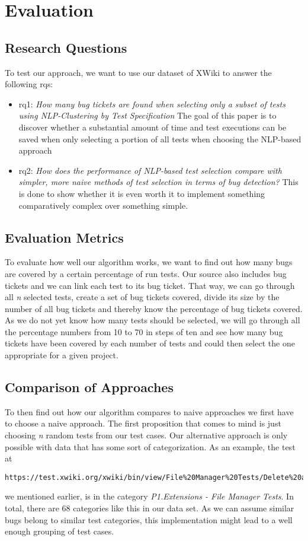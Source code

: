 \section{Evaluation}
\subsection{Research Questions}
To test our approach, we want to use our dataset of XWiki to answer the following \acp{rq}:
\begin{itemize}
    \item \ac{rq}1: \emph{How many bug tickets are found when selecting only a subset of tests using NLP-Clustering by Test Specification}
    The goal of this paper is to discover whether a substantial amount of time and test executions can be saved when only selecting a portion of all tests when choosing the \ac{NLP}-based approach
    \item \ac{rq}2: \emph{How does the performance of NLP-based test selection compare with simpler, more naive methods of test selection in terms of bug detection?} This is done to show whether it is even worth it to implement something comparatively complex over something simple.
\end{itemize}

\subsection{Evaluation Metrics}
To evaluate how well our algorithm works, we want to find out how many bugs are
covered by a certain percentage of run tests. Our source also includes bug
tickets and we can link each test to its bug ticket. That way, we can go
through all \emph{n} selected tests, create a set of bug tickets covered, divide
its size by the number of all bug tickets and thereby know the percentage of bug
tickets covered. As we do not yet know how many tests should be selected, we
will go through all the percentage numbers from 10 to 70 in steps of ten and
see how many bug tickets have been covered by each number of tests and could then select the one appropriate for a given project.

\subsection{Comparison of Approaches}
To then find out how our algorithm compares to naive approaches we first have
to choose a naive approach. The first proposition that comes to mind is just
choosing \emph{n} random tests from our test cases. Our alternative approach is only
possible with data that has some sort of categorization. As an example, the
test at
\begin{verbatim}
https://test.xwiki.org/xwiki/bin/view/File%20Manager%20Tests/Delete%20a%20file
\end{verbatim}
we mentioned earlier, is in the category \emph{P1.Extensions - File Manager
    Tests}. In total, there are 68 categories like this in our data set. As we can
assume similar bugs belong to similar test categories, this implementation
might lead to a well enough grouping of test cases.

